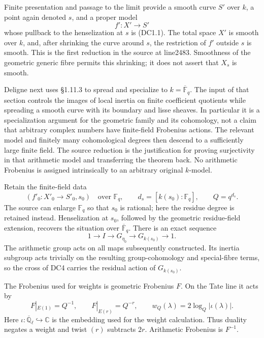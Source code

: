 \documentclass[
]{report}
\begin{document}
Finite presentation and passage to the limit provide a smooth curve
\(S'\) over \(k\), a point again denoted \(s\), and a proper model \[
f':X'\longrightarrow S'
\tag{DC2.1}
\] whose pullback to the henselization at \(s\) is (DC1.1). The total
space \(X'\) is smooth over \(k\), and, after shrinking the curve around
\(s\), the restriction of \(f'\) outside \(s\) is smooth. This is the
first reduction in the source at line2483. Smoothness of the geometric
generic fibre permits this shrinking; it does not assert that \(X_s\) is
smooth.

Deligne next uses §1.11.3 to spread and specialize to
\(k=\overline{\mathbb F}_q\). The input of that section controls the
images of local inertia on finite coefficient quotients while spreading
a smooth curve with its boundary and lisse sheaves. In particular it is
a specialization argument for the geometric family and its cohomology,
not a claim that arbitrary complex numbers have finite-field Frobenius
actions. The relevant model and finitely many cohomological degrees then
descend to a sufficiently large finite field. The source reduction is
the justification for proving surjectivity in that arithmetic model and
transferring the theorem back. No arithmetic Frobenius is assigned
intrinsically to an arbitrary original \(k\)-model.

Retain the finite-field data \[
(f'_0:X'_0\to S'_0,s_0)\quad\text{over }\mathbb F_q,\qquad
d_s=[k(s_0):\mathbb F_q],\qquad Q=q^{d_s}.
\tag{DC2.2}
\] The source can enlarge \(\mathbb F_q\) so that \(s_0\) is rational;
here the residue degree is retained instead. Henselization at \(s_0\),
followed by the geometric residue-field extension, recovers the
situation over \(\overline{\mathbb F}_q\). There is an exact sequence \[
1\longrightarrow I\longrightarrow G_{\eta_0}
 \longrightarrow G_{k(s_0)}\longrightarrow1.
\tag{DC2.3}
\] The arithmetic group acts on all maps subsequently constructed. Its
inertia subgroup acts trivially on the resulting group-cohomology and
special-fibre terms, so the cross of DC4 carries the residual action of
\(G_{k(s_0)}\).

The Frobenius used for weights is geometric Frobenius \(F\). On the Tate
line it acts by \[
F|_{E(1)}=Q^{-1},\qquad
F|_{E(r)}=Q^{-r},\qquad
w_Q(\lambda)=2\log_Q|\iota(\lambda)|.
\tag{DC2.4}
\] Here \(\iota:\overline{\mathbb Q}_\ell\hookrightarrow\mathbb C\) is
the embedding used for the weight calculation. Thus duality negates a
weight and twist \((r)\) subtracts \(2r\). Arithmetic Frobenius is
\(F^{-1}\).
\end{document}
